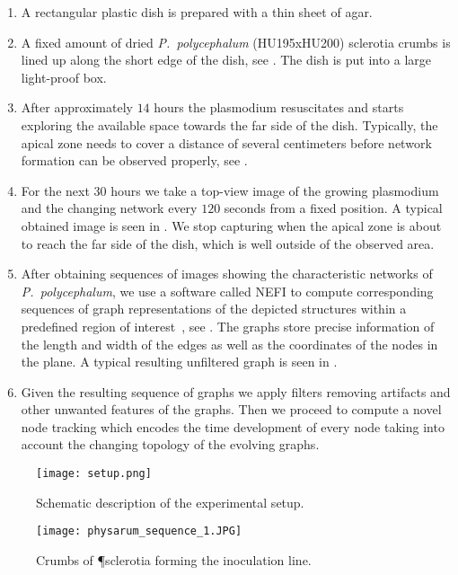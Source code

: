 	\begin{enumerate}
		\item A rectangular plastic dish is prepared with a thin sheet of agar.
		\item A fixed amount of dried \emph{P.~polycephalum} (HU195xHU200) sclerotia crumbs is lined up along the short edge of the dish, see . The dish is put into a large light-proof box.
		\item After approximately $14$ hours the plasmodium resuscitates and starts exploring the available space towards the far side of the dish. Typically, the apical zone needs to cover a distance of several centimeters before network formation can be observed properly, see .
		\item For the next $30$ hours we take a top-view image of the growing plasmodium and the changing network every $120$ seconds from a fixed position. A typical obtained image is seen in . We stop capturing when the apical zone is about to reach the far side of the dish, which is well outside of the observed area. 
		\item After obtaining sequences of images showing the characteristic networks of \emph{P.~polycephalum}, we use a software called NEFI to compute corresponding sequences of graph representations of the depicted structures within a predefined region of interest~\cite{dirnberger2015nefi}, see . The graphs store precise information of the length and width of the edges as well as the coordinates of the nodes in the plane. A typical resulting unfiltered graph is seen in .
		\item Given the resulting sequence of graphs we apply filters removing artifacts and other unwanted features of the graphs. Then we proceed to compute a novel node tracking which encodes the time development of every node taking into account the changing topology of the evolving graphs.
	\end{enumerate}

	\begin{figure}
		\centering
		\texttt{[image: setup.png]}
		\caption[Setup for wetlab experiments.]{Schematic description of the experimental setup.}
		\label{fig:setup}
	\end{figure}

	\begin{figure}
		\centering
		\texttt{[image: physarum\_sequence\_1.JPG]}
		\caption[Crumbs of \P sclerotia forming an inoculation line.]{Crumbs of \P sclerotia forming the inoculation line.}
		\label{fig:sequence_1}
	\end{figure}

